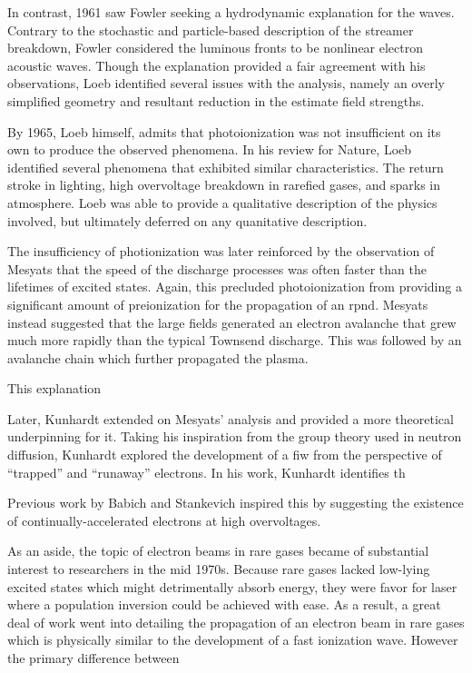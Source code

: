 In contrast, 1961 saw Fowler \cite{Fowler1961} seeking a hydrodynamic
explanation for the waves. Contrary to the stochastic and particle-based
description of the streamer breakdown, Fowler considered the luminous fronts to
be nonlinear electron acoustic waves. Though the explanation provided a fair
agreement with his observations, Loeb \cite{Loeb1965} identified several
issues with the analysis, namely an overly simplified geometry and resultant
reduction in the estimate field strengths.

By 1965, Loeb himself, admits that photoionization was not insufficient on its
own to produce the observed phenomena. In his review for Nature, Loeb
identified several phenomena that exhibited similar characteristics. The
return stroke in lighting, high overvoltage breakdown in rarefied gases, and
sparks in atmosphere. Loeb was able to provide a qualitative description of the
physics involved, but ultimately deferred on any quanitative description.

The insufficiency of photionization was later reinforced by the observation of
Mesyats \cite{Mesyats1972} that the speed of the discharge processes was often
faster than the lifetimes of excited states. Again, this precluded
photoionization from providing a significant amount of preionization for the
propagation of an rpnd. Mesyats instead suggested that the large fields
generated an electron avalanche that grew much more rapidly than the typical
Townsend discharge. This was followed by an avalanche chain which further
propagated the plasma.

This explanation 

Later, Kunhardt \cite{Kunhardt1980} extended on Mesyats' analysis and provided a
more theoretical underpinning for it. Taking his inspiration from the group
theory used in neutron diffusion, Kunhardt explored the development of a fiw
from the perspective of ``trapped'' and ``runaway'' electrons. In his
work, Kunhardt identifies th

Previous work by
Babich and Stankevich \cite{Babich1973} inspired this by suggesting the
existence of continually-accelerated electrons at high overvoltages.

As an aside, the topic of electron beams in rare gases became of substantial
interest to researchers in the mid 1970s. Because rare gases lacked low-lying
excited states which might detrimentally absorb energy, they were favor for
laser where a population inversion could be achieved with ease. As a result, a
great deal of work went into detailing the propagation of an electron beam in
rare gases which is physically similar to the development of a fast ionization
wave. However the primary difference between

